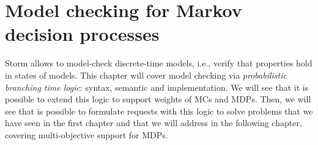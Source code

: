 \chapter{Model checking for Markov decision processes}

Storm allows to model-check discrete-time models, i.e.,
verify that properties hold in states of models. This
chapter will cover model checking via \textit{probabilistic branching time logic}: syntax, semantic and implementation.
We will see that it is possible to extend this logic to support weights of MCs and MDPs. Then, we will see that is
possible to formulate requests with this logic to solve
problems that we have seen in the first chapter and that we
will address in the following chapter, covering multi-objective support for MDPs.
